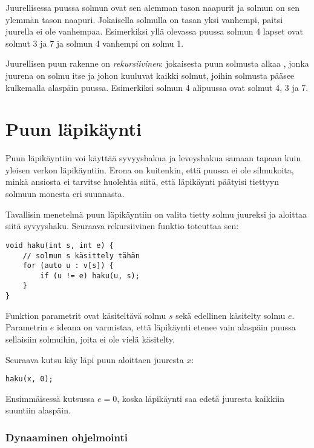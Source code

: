 
Juurellisessa puussa solmun 
ovat sen alemman tason naapurit
ja solmun 
on sen ylemmän tason naapuri.
Jokaisella solmulla on tasan yksi vanhempi,
paitsi juurella ei ole vanhempaa.
Esimerkiksi yllä olevassa puussa solmun 4
lapset ovat solmut 3 ja 7 ja solmun 4 vanhempi on solmu 1.


Juurellisen puun rakenne on \emph{rekursiivinen}:
jokaisesta puun solmusta alkaa ,
jonka juurena on solmu itse ja johon kuuluvat
kaikki solmut, joihin solmusta pääsee kulkemalla alaspäin puussa.
Esimerkiksi solmun 4 alipuussa
ovat solmut 4, 3 ja 7.

\section{Puun läpikäynti}

Puun läpikäyntiin voi käyttää syvyyshakua ja
leveyshakua samaan
tapaan kuin yleisen verkon läpikäyntiin.
Erona on kuitenkin, että puussa ei ole silmukoita,
minkä ansiosta ei tarvitse huolehtia siitä,
että läpikäynti päätyisi tiettyyn
solmuun monesta eri suunnasta.

Tavallisin menetelmä puun läpikäyntiin on
valita tietty solmu juureksi ja aloittaa
siitä syvyyshaku.
Seuraava rekursiivinen funktio toteuttaa sen:

\begin{lstlisting}
void haku(int s, int e) {
    // solmun s käsittely tähän
    for (auto u : v[s]) {
        if (u != e) haku(u, s);
    }
}
\end{lstlisting}

Funktion parametrit ovat käsiteltävä solmu $s$
sekä edellinen käsitelty solmu $e$.
Parametrin $e$ ideana on varmistaa, että
läpikäynti etenee vain alaspäin puussa
sellaisiin solmuihin, joita ei ole vielä käsitelty.

Seuraava kutsu käy läpi puun aloittaen juuresta $x$:

\begin{lstlisting}
haku(x, 0);
\end{lstlisting}

Ensimmäisessä kutsussa $e=0$, koska läpikäynti
saa edetä juuresta kaikkiin suuntiin alaspäin.

\subsubsection{Dynaaminen ohjelmointi}


